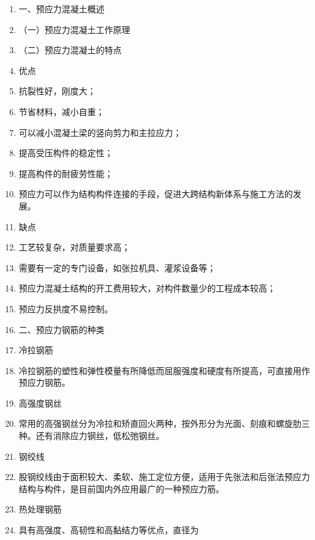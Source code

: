 \documentclass[UTF8,fontset=fandol,11pt]{ctexart}
\begin{document}
\begin{enumerate}[label=\arabic*.]

\item 一、预应力混凝土概述

\item （一）预应力混凝土工作原理

\item （二）预应力混凝土的特点

\item 优点

\item 抗裂性好，刚度大；

\item 节省材料，减小自重；

\item 可以减小混凝土梁的竖向剪力和主拉应力；

\item 提高受压构件的稳定性；

\item 提高构件的耐疲劳性能；

\item 预应力可以作为结构构件连接的手段，促进大跨结构新体系与施工方法的发展。

\item 缺点

\item 工艺较复杂，对质量要求高；

\item 需要有一定的专门设备，如张拉机具、灌浆设备等；

\item 预应力混凝土结构的开工费用较大，对构件数量少的工程成本较高；

\item 预应力反拱度不易控制。

\item 二、预应力钢筋的种类

\item 冷拉钢筋

\item 冷拉钢筋的塑性和弹性模量有所降低而屈服强度和硬度有所提高，可直接用作预应力钢筋。

\item 高强度钢丝

\item 常用的高强钢丝分为冷拉和矫直回火两种，按外形分为光面、刻痕和螺旋肋三种。还有消除应力钢丝，低松弛钢丝。

\item 钢绞线

\item 股钢绞线由于面积较大、柔软、施工定位方便，适用于先张法和后张法预应力结构与构件，是目前国内外应用最广的一种预应力筋。

\item 热处理钢筋

\item 具有高强度、高韧性和高黏结力等优点，直径为

\end{enumerate}

\newpage
\end{document}
